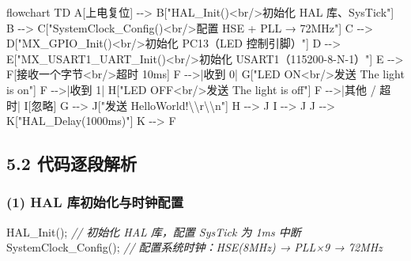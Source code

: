 \documentclass[
  chinese,
  UTF8,
  oneside,
  openany]{ctexbook}
\newenvironment{Shaded}{}{}
\newcommand{\CommentTok}[1]{\textcolor[rgb]{0.38,0.63,0.69}{\textit{#1}}}
\newcommand{\NormalTok}[1]{#1}
\newcommand{\OperatorTok}[1]{\textcolor[rgb]{0.40,0.40,0.40}{#1}}
\begin{document}
\begin{Shaded}
\begin{Highlighting}[]
\NormalTok{flowchart TD}
\NormalTok{    A[上电复位] {-}{-}\textgreater{} B["HAL\_Init()\textless{}br/\textgreater{}初始化 HAL 库、SysTick"]}
\NormalTok{    B {-}{-}\textgreater{} C["SystemClock\_Config()\textless{}br/\textgreater{}配置 HSE + PLL → 72MHz"]}
\NormalTok{    C {-}{-}\textgreater{} D["MX\_GPIO\_Init()\textless{}br/\textgreater{}初始化 PC13（LED 控制引脚）"]}
\NormalTok{    D {-}{-}\textgreater{} E["MX\_USART1\_UART\_Init()\textless{}br/\textgreater{}初始化 USART1（115200{-}8{-}N{-}1）"]}
\NormalTok{    E {-}{-}\textgreater{} F[接收一个字节\textless{}br/\textgreater{}超时 10ms]}
\NormalTok{    F {-}{-}\textgreater{}|收到 \textquotesingle{}0\textquotesingle{}| G["LED ON\textless{}br/\textgreater{}发送 The light is on"]}
\NormalTok{    F {-}{-}\textgreater{}|收到 \textquotesingle{}1\textquotesingle{}| H["LED OFF\textless{}br/\textgreater{}发送 The light is off"]}
\NormalTok{    F {-}{-}\textgreater{}|其他 / 超时| I[忽略]}
\NormalTok{    G {-}{-}\textgreater{} J["发送 HelloWorld!\textbackslash{}\textbackslash{}r\textbackslash{}\textbackslash{}n"]}
\NormalTok{    H {-}{-}\textgreater{} J}
\NormalTok{    I {-}{-}\textgreater{} J}
\NormalTok{    J {-}{-}\textgreater{} K["HAL\_Delay(1000ms)"]}
\NormalTok{    K {-}{-}\textgreater{} F}
\end{Highlighting}
\end{Shaded}

\subsection{5.2
代码逐段解析}\label{ux4ee3ux7801ux9010ux6bb5ux89e3ux6790}

\subsubsection{(1) HAL
库初始化与时钟配置}\label{hal-ux5e93ux521dux59cbux5316ux4e0eux65f6ux949fux914dux7f6e}

\begin{Shaded}
\begin{Highlighting}[]
\NormalTok{HAL\_Init}\OperatorTok{();}              \CommentTok{// 初始化 HAL 库，配置 SysTick 为 1ms 中断}
\NormalTok{SystemClock\_Config}\OperatorTok{();}    \CommentTok{// 配置系统时钟：HSE(8MHz) → PLL×9 → 72MHz}
\end{Highlighting}
\end{Shaded}
\end{document}
